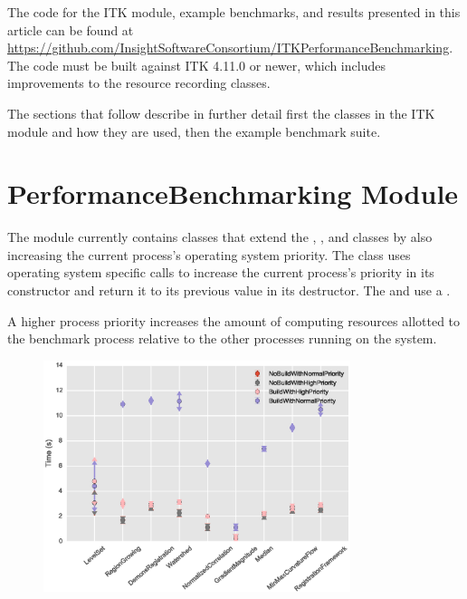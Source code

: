 \documentclass{InsightArticle}
\begin{document}
The code for the ITK module, example benchmarks, and results presented in this
article can be found at
\url{https://github.com/InsightSoftwareConsortium/ITKPerformanceBenchmarking}.
The code must be built against ITK 4.11.0 or newer, which includes improvements to
the resource recording classes.

The sections that follow describe in further detail first the classes in the
 ITK module and how they are used, then the
example benchmark suite.

\section{PerformanceBenchmarking Module}

The  module currently contains classes that
extend the , , and
 classes by also increasing the current
process's operating system priority. The 
class uses operating system specific calls to increase the current process's
priority in its constructor and return it to its previous value in its
destructor. The  and
 use a
.

A higher process priority increases the amount of computing resources allotted
to the benchmark process relative to the other processes running on the
system.

\begin{figure}
\center
\includegraphics[width=0.8\textwidth]{FigureProcessorPriority/ProcessorPriority.eps}
\label{fig:ProcessorPriority}
\end{figure}
\end{document}
